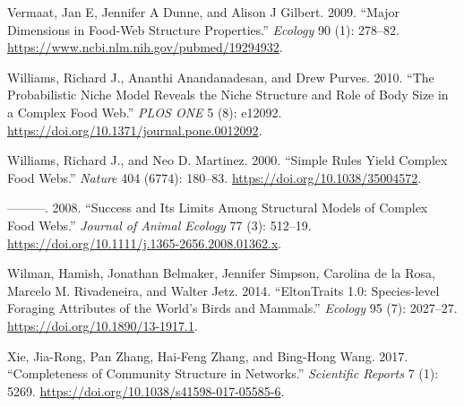 \documentclass[
  letterpaper,
  DIV=11,
  numbers=noendperiod]{scrartcl}
\newlength{\cslhangindent}
\newenvironment{CSLReferences}[2] %
 {\begin{list}{}{%
  \setlength{\itemindent}{0pt}
  \setlength{\leftmargin}{0pt}
  \setlength{\parsep}{0pt}
  \ifodd #1
   \setlength{\leftmargin}{\cslhangindent}
   \setlength{\itemindent}{-1\cslhangindent}
  \fi
  \setlength{\itemsep}{#2\baselineskip}}}
 {\end{list}}
\begin{document}
\begin{CSLReferences}{1}{0}
Vermaat, Jan E, Jennifer A Dunne, and Alison J Gilbert. 2009. {``Major
Dimensions in Food-Web Structure Properties.''} \emph{Ecology} 90 (1):
278--82. \url{https://www.ncbi.nlm.nih.gov/pubmed/19294932}.

Williams, Richard J., Ananthi Anandanadesan, and Drew Purves. 2010.
{``The {Probabilistic Niche Model Reveals} the {Niche Structure} and
{Role} of {Body Size} in a {Complex Food Web}.''} \emph{PLOS ONE} 5 (8):
e12092. \url{https://doi.org/10.1371/journal.pone.0012092}.

Williams, Richard J., and Neo D. Martinez. 2000. {``Simple Rules Yield
Complex Food Webs.''} \emph{Nature} 404 (6774): 180--83.
\url{https://doi.org/10.1038/35004572}.

---------. 2008. {``Success and Its Limits Among Structural Models of
Complex Food Webs.''} \emph{Journal of Animal Ecology} 77 (3): 512--19.
\url{https://doi.org/10.1111/j.1365-2656.2008.01362.x}.

Wilman, Hamish, Jonathan Belmaker, Jennifer Simpson, Carolina de la
Rosa, Marcelo M. Rivadeneira, and Walter Jetz. 2014. {``{EltonTraits}
1.0: {Species-level} Foraging Attributes of the World's Birds and
Mammals.''} \emph{Ecology} 95 (7): 2027--27.
\url{https://doi.org/10.1890/13-1917.1}.

Xie, Jia-Rong, Pan Zhang, Hai-Feng Zhang, and Bing-Hong Wang. 2017.
{``Completeness of {Community Structure} in {Networks}.''}
\emph{Scientific Reports} 7 (1): 5269.
\url{https://doi.org/10.1038/s41598-017-05585-6}.

\end{CSLReferences}
\end{document}
